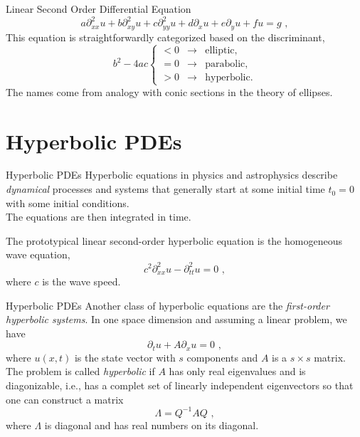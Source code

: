 \documentclass[11pt]{beamer}
\begin{document}
\begin{frame}[fragile]{Linear Second Order Differential Equation}
\begin{equation}
a \partial^2_{xx} u + b \partial^2_{xy} u + c \partial^2_{yy} u + d \partial_x u + e \partial_y u + f u = g\,\,,
\end{equation}
This equation is straightforwardly categorized based on the discriminant,
\begin{equation}
b^2 - 4ac \left\{ \begin{array}{lcr}
< 0 & \rightarrow & \text{elliptic},\\
= 0 & \rightarrow & \text{parabolic},\\
> 0 & \rightarrow & \text{hyperbolic}.
\end{array}\right.
\end{equation}
The names come from analogy with conic sections in the theory of
ellipses.
\end{frame}

\section{Hyperbolic PDEs}
\begin{frame}[fragile]{Hyperbolic PDEs}
Hyperbolic equations in physics and astrophysics
describe \emph{dynamical} processes and systems that generally start
at some initial time $t_0=0$ with some initial conditions. \\
The equations are then integrated in time. \\
\bigskip

The prototypical linear second-order hyperbolic equation is the
homogeneous wave equation,
\begin{equation}
c^2 \partial^2_{xx} u - \partial^2_{tt} u = 0\,\,,
\end{equation}
where $c$ is the wave speed.
\end{frame}

\begin{frame}[fragile]{Hyperbolic PDEs}
Another  class of hyperbolic equations are the \emph{first-order
hyperbolic systems}. In one space dimension and assuming a linear
problem, we have
\begin{equation}
\partial_t u + A \partial_x u = 0\,\,,
\label{eq:pde_linear1}
\end{equation}
where $u(x,t)$ is the state vector with $s$ components and $A$
is a $s \times s$ matrix. \\
The problem is called \emph{hyperbolic} if
$A$ has only real eigenvalues and is diagonizable, i.e., has a complet set
of linearly independent eigenvectors so that one can construct a 
matrix
\begin{equation}
\Lambda = Q^{-1} A Q\,\,,
\end{equation}
where $\Lambda$ is diagonal and has real numbers on its diagonal. 
\end{frame}
\end{document}

